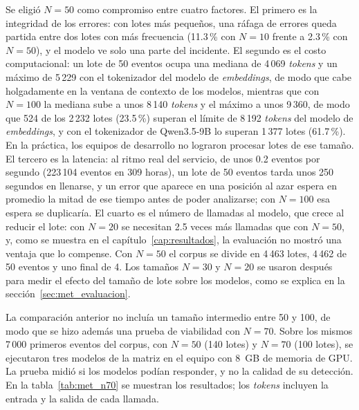 Se eligió $N = 50$ como compromiso entre cuatro factores. El primero es la integridad de los errores: con lotes más pequeños, una ráfaga de errores queda partida entre dos lotes con más frecuencia (11.3\,\% con $N = 10$ frente a 2.3\,\% con $N = 50$), y el modelo ve solo una parte del incidente. El segundo es el costo computacional: un lote de 50 eventos ocupa una mediana de 4\,069 \textit{tokens} y un máximo de 5\,229 con el tokenizador del modelo de \textit{embeddings}, de modo que cabe holgadamente en la ventana de contexto de los modelos, mientras que con $N = 100$ la mediana sube a unos 8\,140 \textit{tokens} y el máximo a unos 9\,360, de modo que 524 de los 2\,232 lotes (23.5\,\%) superan el límite de 8\,192 \textit{tokens} del modelo de \textit{embeddings}, y con el tokenizador de Qwen3.5-9B lo superan 1\,377 lotes (61.7\,\%). En la práctica, los equipos de desarrollo no lograron procesar lotes de ese tamaño. El tercero es la latencia: al ritmo real del servicio, de unos 0.2 eventos por segundo (223\,104 eventos en 309 horas), un lote de 50 eventos tarda unos 250 segundos en llenarse, y un error que aparece en una posición al azar espera en promedio la mitad de ese tiempo antes de poder analizarse; con $N = 100$ esa espera se duplicaría. El cuarto es el número de llamadas al modelo, que crece al reducir el lote: con $N = 20$ se necesitan 2.5 veces más llamadas que con $N = 50$, y, como se muestra en el capítulo~\ref{cap:resultados}, la evaluación no mostró una ventaja que lo compense. Con $N = 50$ el corpus se divide en 4\,463 lotes, 4\,462 de 50 eventos y uno final de 4. Los tamaños $N = 30$ y $N = 20$ se usaron después para medir el efecto del tamaño de lote sobre los modelos, como se explica en la sección~\ref{sec:met_evaluacion}.

La comparación anterior no incluía un tamaño intermedio entre 50 y 100, de modo que se hizo además una prueba de viabilidad con $N = 70$. Sobre los mismos 7\,000 primeros eventos del corpus, con $N = 50$ (140 lotes) y $N = 70$ (100 lotes), se ejecutaron tres modelos de la matriz en el equipo con 8~GB de memoria de GPU. La prueba midió si los modelos podían responder, y no la calidad de su detección. En la tabla~\ref{tab:met_n70} se muestran los resultados; los \textit{tokens} incluyen la entrada y la salida de cada llamada.

